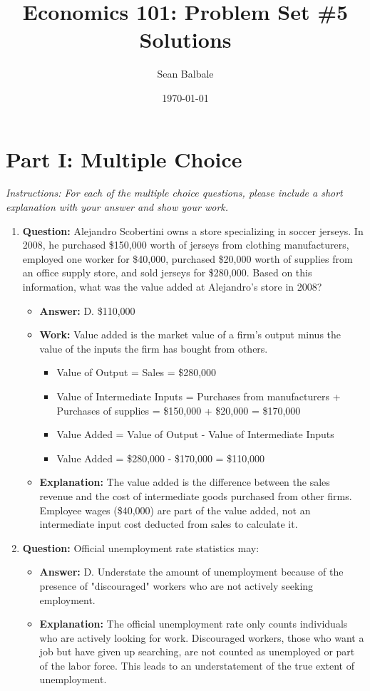 \documentclass{article}
\title{Economics 101: Problem Set \#5 Solutions}
\author{Sean Balbale} %
\date{\today} %
\begin{document}
\maketitle

\section*{Part I: Multiple Choice}
\textit{Instructions: For each of the multiple choice questions, please include a short explanation with your answer and show your work.}

\begin{enumerate}[label=\arabic*.]
  \item \textbf{Question:} Alejandro Scobertini owns a store specializing in soccer jerseys. In 2008, he purchased \$150,000 worth of jerseys from clothing manufacturers, employed one worker for \$40,000, purchased \$20,000 worth of supplies from an office supply store, and sold jerseys for \$280,000. Based on this information, what was the value added at Alejandro's store in 2008?
    \begin{itemize}
      \item \textbf{Answer:} D. \$110,000
      \item \textbf{Work:} Value added is the market value of a firm's output minus the value of the inputs the firm has bought from others.
        \begin{itemize}
          \item Value of Output = Sales = \$280,000
          \item Value of Intermediate Inputs = Purchases from manufacturers + Purchases of supplies = \$150,000 + \$20,000 = \$170,000
          \item Value Added = Value of Output - Value of Intermediate Inputs
          \item Value Added = \$280,000 - \$170,000 = \$110,000
        \end{itemize}
      \item \textbf{Explanation:} The value added is the difference between the sales revenue and the cost of intermediate goods purchased from other firms. Employee wages (\$40,000) are part of the value added, not an intermediate input cost deducted from sales to calculate it.
    \end{itemize}

  \item \textbf{Question:} Official unemployment rate statistics may:
    \begin{itemize}
      \item \textbf{Answer:} D. Understate the amount of unemployment because of the presence of "discouraged" workers who are not actively seeking employment.
      \item \textbf{Explanation:} The official unemployment rate only counts individuals who are actively looking for work. Discouraged workers, those who want a job but have given up searching, are not counted as unemployed or part of the labor force. This leads to an understatement of the true extent of unemployment.
    \end{itemize}


\end{enumerate}
\end{document}
